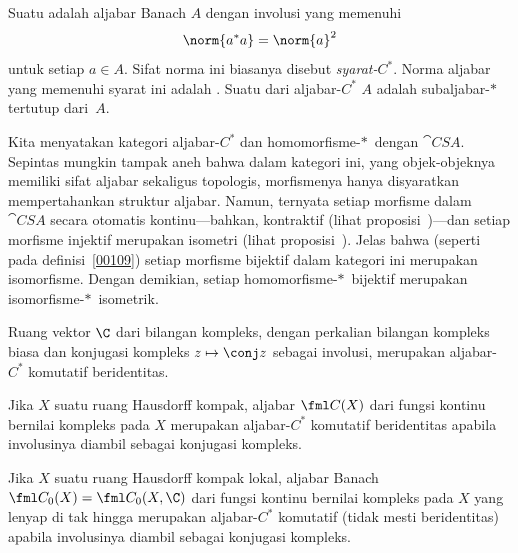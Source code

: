 
\begin{defn}\label{0013} Suatu
 adalah aljabar Banach $A$ dengan involusi yang memenuhi
   \[ \norm{a^*a} = \norm{a}^2 \]
untuk setiap $a \in A$.  Sifat norma ini biasanya disebut
\emph{syarat-$C^*$}. Norma aljabar yang memenuhi syarat ini adalah
.  Suatu
 dari aljabar-$C^*$ $A$ adalah subaljabar-$*\,$ tertutup dari~$A$.

Kita menyatakan kategori aljabar-$C^*$ dan homomorfisme-$*\,$ dengan $\cat{CSA}$.
Sepintas mungkin tampak aneh bahwa dalam kategori ini, yang objek-objeknya memiliki sifat aljabar sekaligus topologis,
morfismenya hanya disyaratkan mempertahankan struktur aljabar. Namun, ternyata
setiap morfisme dalam $\cat{CSA}$ secara otomatis kontinu---bahkan, kontraktif (lihat
proposisi~)---dan
setiap morfisme injektif merupakan isometri (lihat proposisi~).  Jelas bahwa
(seperti pada definisi~\ref{00109}) setiap morfisme bijektif dalam kategori ini merupakan isomorfisme. Dengan demikian, setiap homomorfisme-$*\,$ bijektif
merupakan isomorfisme-$*\,$ isometrik.
\end{defn}

\begin{exam} Ruang vektor $\C$ dari bilangan kompleks, dengan perkalian bilangan kompleks biasa
dan konjugasi kompleks $z \mapsto \conj z$ sebagai involusi, merupakan aljabar-$C^*$
komutatif beridentitas.
\end{exam}

\begin{exam} Jika $X$ suatu ruang Hausdorff kompak, aljabar $\fml C(X)$ dari fungsi kontinu
bernilai kompleks pada $X$ merupakan aljabar-$C^*$ komutatif beridentitas apabila involusinya
diambil sebagai konjugasi kompleks.
\end{exam}

\begin{exam} Jika $X$ suatu ruang Hausdorff kompak lokal, aljabar Banach
$\fml C_0(X) = \fml C_0(X,\C)$ dari fungsi kontinu bernilai kompleks pada $X$ yang lenyap
di tak hingga merupakan aljabar-$C^*$ komutatif (tidak mesti beridentitas) apabila involusinya
diambil sebagai konjugasi kompleks.
\end{exam}

